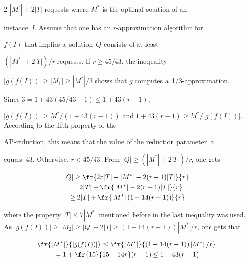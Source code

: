 \begin{multicols}{2}
$|M^*|+2|T|$ requests where $M^*$ is the optimal solution of an


instance~$I$. Assume that one has an $r$-approximation algorithm for


$f(I)$ that implies a~solution~$Q$ consists of at least


$(|M^*|+2|T|)/r$ requests. If $r \geq 45/43$, the inequality


$|g(f(I))| \geq |M_1| \geq |M^*|/3$ shows that $g$ computes a~1/3-approximation.


Since $3=1+43(45/43-1)$\linebreak $ \leq 1+43(r-1)$,


$|g(f(I))| \geq {M^*}/({1+43(r-1)})$ and $1+43(r-1) \geq


{M^*}/{|g(f(I))|}$. According to the fifth property of the


AP-reduction, this means that the value of the reduction parameter~$\alpha$


equals~43. Otherwise, $r < 45/43$. From $|Q| \geq


(|M^*|+2|T|)/r$, one  gets


\begin{multline*}


|Q| \geq \fr{2r|T|+\left\vert M^*\right\vert -2(r-1)|T|}{r}\\


{} =


2|T|+ \fr{\left\vert M^*\right\vert-2(r-1)|T|}{r} \\


{}\geq 2|T|+


\fr{\left\vert M^*\right\vert(1-14(r-1))}{r}


\end{multline*}


 where the property $|T| \leq


7|M^*|$ mentioned before in the last inequality was used. As $|g(f(I))| \geq


|M_2| $\linebreak $\geq |Q|-2|T| \geq {(1-14(r-1))|M^*|}/{r}$, one gets that


\begin{multline*}


\fr{\left\vert M^*\right\vert}{|g(f(I))|} \leq \fr{\left\vert M^*\right\vert}


{(1-14(r-1))\left\vert M^*\right\vert/r}\\


{} =


1+\fr{15}{15-14r}(r-1) \leq 1+43(r-1)



\end{multline*}
\end{multicols}
